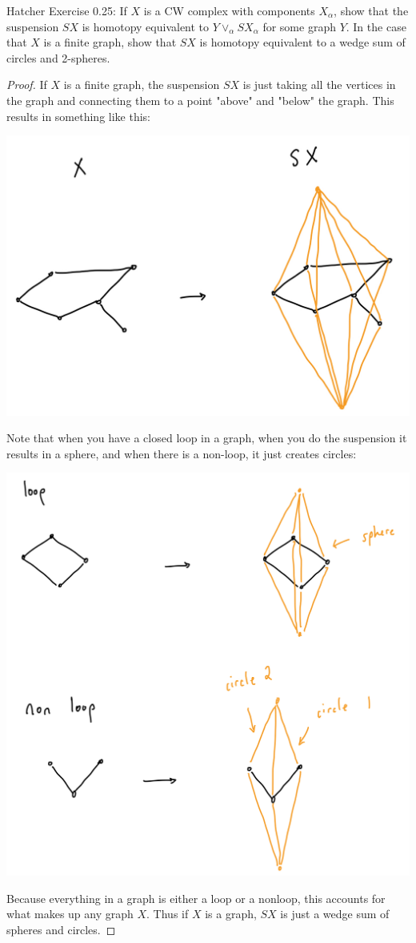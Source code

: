 \documentclass[12pt]{article}
\newenvironment{statement}[2][Statement]{\begin{trivlist}
\item[\hskip \labelsep {\bfseries #1}\hskip \labelsep {\bfseries #2.}]}{\end{trivlist}}
\begin{document}
\begin{statement}[Exercise]{4}
    Hatcher Exercise 0.25: If $X$ is a CW complex with components $X_{\alpha}$, show that the suspension $SX$ is homotopy equivalent to $Y \vee_{\alpha} SX_{\alpha}$ for some graph $Y$. In the case that $X$ is a finite graph, show that $SX$ is homotopy equivalent to a wedge sum of circles and 2-spheres. 
\end{statement}
\begin{proof}
    If $X$ is a finite graph, the suspension $SX$ is just taking all the vertices in the graph and connecting them to a point "above" and "below" the graph. This results in something like this: 
    \par \includegraphics[scale=.2]{4-1.png}
    \par Note that when you have a closed loop in a graph, when you do the suspension it results in a sphere, and when there is a non-loop, it just creates circles:
    \par \includegraphics[scale=.2]{4-2.png}
    \par Because everything in a graph is either a loop or a nonloop, this accounts for what makes up any graph $X$. Thus if $X$ is a graph, $SX$ is just a wedge sum of spheres and circles. 
\end{proof}
\end{document}
